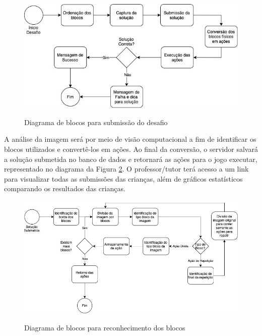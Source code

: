    \begin{figure}[H]
        \caption{Diagrama de blocos para submissão do desafio}
        \centering
        \includegraphics[width=\linewidth]{Imagens/Cap3/Blocos Desafio.jpg}
        \label{figura:blocos_desafio}
    \end{figure}
    
    A análise da imagem será por meio de visão computacional a fim de identificar os blocos utilizados e convertê-los em ações. Ao final da conversão, o servidor salvará a solução submetida no banco de dados e retornará as ações para o jogo executar, representado no diagrama da Figura \ref{figura:blocos_reconhecimento}. O professor/tutor terá acesso a um link para visualizar todas as submissões das crianças, além de gráficos estatísticos comparando os resultados das crianças.
    
    \begin{figure}[H]
        \caption{Diagrama de blocos para reconhecimento dos blocos}
        \centering
        \includegraphics[width=\linewidth]{Imagens/Cap3/Blocos Reconhecimento.jpg}
        \label{figura:blocos_reconhecimento}
    \end{figure}
    
